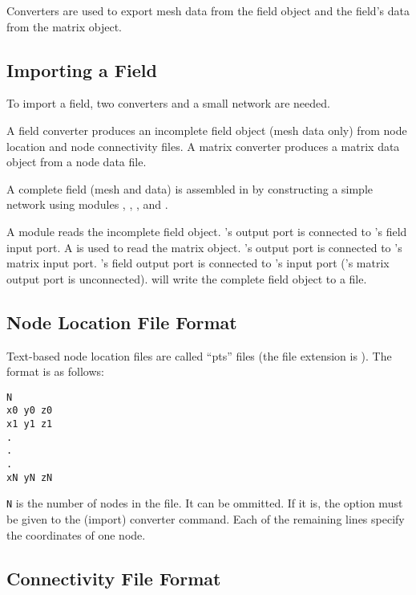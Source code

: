 Converters are used to export mesh data from the field object and the
field's data from the matrix object.

\subsection{Importing a Field}
\label{sec:import_field}

To import a field, two converters and a small \sr{} network are needed.

A field converter produces an incomplete \sr{} field object (mesh data
only) from node location and node connectivity files.  A matrix
converter produces a \sr{} matrix data object from a node data file.

A complete field (mesh and data) is assembled in \sr{} by
constructing a simple network using modules ,
,  , and
.

A  module reads the incomplete field object.
's output port is connected to
's field input port.  A
 is used to read the matrix object.
's output port is connected to
's matrix input port.
's field output port is connected to
's input port ('s
matrix output port is unconnected).   will write
the complete field object to a file.

\subsection{Node Location File Format}
\label{sec:node_loc_fmt}

Text-based node location files are called ``pts'' files (the file
extension is ).  The format is as follows:

\begin{verbatim}
N
x0 y0 z0
x1 y1 z1
.
.
.
xN yN zN
\end{verbatim}

\verb|N| is the number of nodes in the file.  It can be ommitted.  If
it is, the  option must be given to the (import)
converter command.  Each of the remaining lines specify the
coordinates of one node.

\subsection{Connectivity File Format}
\label{sec:node_conn_fmt}

